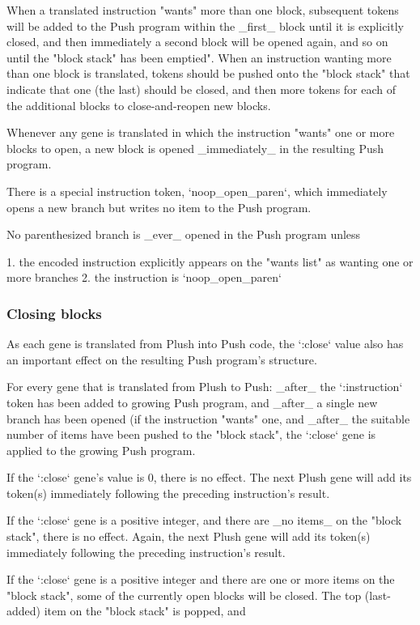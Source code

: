 When a translated instruction "wants" more than one block, subsequent tokens will be added to the Push program within the \_first\_ block until it is explicitly closed, and then immediately a second block will be opened again, and so on until the "block stack" has been emptied". When an instruction wanting more than one block is translated, tokens should be pushed onto the "block stack" that indicate that one (the last) should be closed, and then more tokens for each of the additional blocks to close-and-reopen new blocks.

Whenever any gene is translated in which the instruction "wants" one or more blocks to open, a new block is opened \_immediately\_ in the resulting Push program.

There is a special instruction token, `noop\_open\_paren`, which immediately opens a new branch but writes no item to the Push program.

No parenthesized branch is \_ever\_ opened in the Push program unless

1. the encoded instruction explicitly appears on the "wants list" as wanting one or more branches
2. the instruction is `noop\_open\_paren`

\subsubsection{ Closing blocks}

As each gene is translated from Plush into Push code, the `:close` value also has an important effect on the resulting Push program's structure.

For every gene that is translated from Plush to Push: \_after\_ the `:instruction` token has been added to growing Push program, and \_after\_ a single new branch has been opened (if the instruction "wants" one, and \_after\_ the suitable number of items have been pushed to the "block stack", the `:close` gene is applied to the growing Push program.

If the `:close` gene's value is 0, there is no effect. The next Plush gene will add its token(s) immediately following the preceding instruction's result.

If the `:close` gene is a positive integer, and there are \_no items\_ on the "block stack", there is no effect. Again, the next Plush gene will add its token(s) immediately following the preceding instruction's result.

If the `:close` gene is a positive integer and there are one or more items on the "block stack", some of the currently open blocks will be closed. The top (last-added) item on the "block stack" is popped, and

